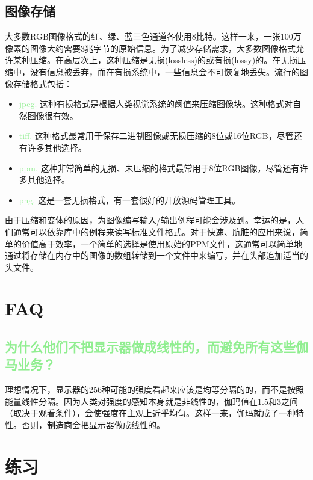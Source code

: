 \documentclass[lang=cn,12pt]{elegantbook}
\begin{document}
\subsection{图像存储}

大多数RGB图像格式的红、绿、蓝三色通道各使用8比特。这样一来，一张100万像素的图像大约需要3兆字节的原始信息。为了减少存储需求，大多数图像格式允许某种压缩。在高层次上，这种压缩是无损(lossless)的或有损(lossy)的。在无损压缩中，没有信息被丢弃，而在有损系统中，一些信息会不可恢复地丢失。流行的图像存储格式包括：

\begin{itemize}
  \item \textcolor{lightgreen}{jpeg.} 这种有损格式是根据人类视觉系统的阈值来压缩图像块。这种格式对自然图像很有效。
  \item \textcolor{lightgreen}{tiff.} 这种格式最常用于保存二进制图像或无损压缩的8位或16位RGB，尽管还有许多其他选择。
  \item \textcolor{lightgreen}{ppm.} 这种非常简单的无损、未压缩的格式最常用于8位RGB图像，尽管还有许多其他选择。
  \item \textcolor{lightgreen}{png.} 这是一套无损格式，有一套很好的开放源码管理工具。
\end{itemize}

由于压缩和变体的原因，为图像编写输入/输出例程可能会涉及到。幸运的是，人们通常可以依靠库中的例程来读写标准文件格式。对于快速、肮脏的应用来说，简单的价值高于效率，一个简单的选择是使用原始的PPM文件，这通常可以简单地通过将存储在内存中的图像的数组转储到一个文件中来编写，并在头部追加适当的头文件。

\section{FAQ}

\subsection{\textcolor{lightgreen}{为什么他们不把显示器做成线性的，而避免所有这些伽马业务？}}

理想情况下，显示器的256种可能的强度看起来应该是均等分隔的的，而不是按照能量线性分隔。因为人类对强度的感知本身就是非线性的，伽玛值在1.5和3之间（取决于观看条件），会使强度在主观上近乎均匀。这样一来，伽玛就成了一种特性。否则，制造商会把显示器做成线性的。

\section{练习}
\end{document}
